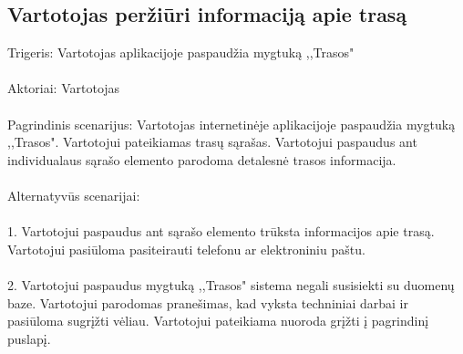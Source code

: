 \documentclass[oneside]{VUMIFPSkursinis}
\begin{document}
\subsection{Vartotojas peržiūri informaciją apie trasą}
	Trigeris: Vartotojas aplikacijoje paspaudžia mygtuką ,,Trasos"\\ \\
	Aktoriai: Vartotojas\\ \\
	Pagrindinis scenarijus: Vartotojas internetinėje aplikacijoje paspaudžia mygtuką ,,Trasos". Vartotojui pateikiamas trasų sąrašas. Vartotojui paspaudus ant individualaus sąrašo elemento parodoma detalesnė trasos informacija.\\ \\
	Alternatyvūs scenarijai:\\ \\
1. Vartotojui paspaudus ant sąrašo elemento trūksta informacijos apie trasą. Vartotojui pasiūloma pasiteirauti telefonu ar elektroniniu paštu.\\ \\
2. Vartotojui paspaudus mygtuką ,,Trasos" sistema negali susisiekti su duomenų baze. Vartotojui parodomas pranešimas, kad vyksta techniniai darbai ir pasiūloma sugrįžti vėliau. Vartotojui pateikiama nuoroda grįžti į pagrindinį puslapį.\\ \\
	
\end{document}
